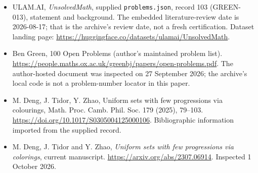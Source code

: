 \documentclass[11pt,a4paper]{article}
\begin{document}
{\small

\begin{itemize}

\item[\hypertarget{source:103:1}{S1}] ULAM.AI, \emph{UnsolvedMath}, supplied \texttt{problems.json}, record 103 (GREEN-013), statement and background. The embedded literature-review date is 2026-08-17; that is the archive’s review date, not a fresh certification. Dataset landing page: \url{https://huggingface.co/datasets/ulamai/UnsolvedMath}.

\item[\hypertarget{source:103:2}{S2}] Ben Green, 100 Open Problems (author’s maintained problem list). \url{https://people.maths.ox.ac.uk/greenbj/papers/open-problems.pdf}. The author-hosted document was inspected on 27 September 2026; the archive’s local code is not a problem-number locator in this paper.

\item[\hypertarget{source:103:3}{S3}] M. Deng, J. Tidor, Y. Zhao, Uniform sets with few progressions via colourings, Math. Proc. Camb. Phil. Soc. 179 (2025), 79--103. \url{https://doi.org/10.1017/S0305004125000106}. Bibliographic information imported from the supplied record.

\item[E1] M. Deng, J. Tidor and Y. Zhao, \emph{Uniform sets with few progressions via colorings}, current manuscript. \url{https://arxiv.org/abs/2307.06914}. Inspected 1 October 2026.

\end{itemize}

}

\label{end:103}
\end{document}
